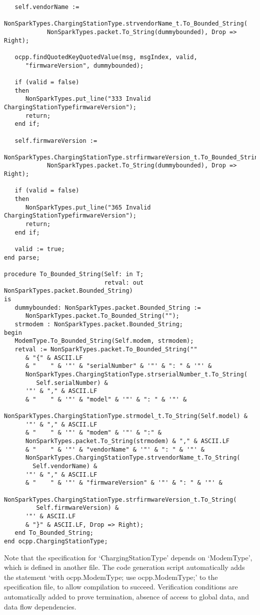 \documentclass[12pt,openany,a4paper]{book}
\begin{document}
\begin{verbatim}
   self.vendorName := 
         NonSparkTypes.ChargingStationType.strvendorName_t.To_Bounded_String(
            NonSparkTypes.packet.To_String(dummybounded), Drop => Right);

   ocpp.findQuotedKeyQuotedValue(msg, msgIndex, valid, 
      "firmwareVersion", dummybounded);

   if (valid = false) 
   then 
      NonSparkTypes.put_line("333 Invalid ChargingStationTypefirmwareVersion"); 
      return; 
   end if;

   self.firmwareVersion := 
      NonSparkTypes.ChargingStationType.strfirmwareVersion_t.To_Bounded_String(
            NonSparkTypes.packet.To_String(dummybounded), Drop => Right);

   if (valid = false) 
   then 
      NonSparkTypes.put_line("365 Invalid ChargingStationTypefirmwareVersion"); 
      return; 
   end if;

   valid := true;
end parse;

procedure To_Bounded_String(Self: in T;
                            retval: out NonSparkTypes.packet.Bounded_String)
is
   dummybounded: NonSparkTypes.packet.Bounded_String := 
      NonSparkTypes.packet.To_Bounded_String(""); 
   strmodem : NonSparkTypes.packet.Bounded_String;
begin
   ModemType.To_Bounded_String(Self.modem, strmodem);
   retval := NonSparkTypes.packet.To_Bounded_String(""
      & "{" & ASCII.LF
      & "    " & '"' & "serialNumber" & '"' & ": " & '"' &
      NonSparkTypes.ChargingStationType.strserialNumber_t.To_String(
         Self.serialNumber) & 
      '"' & "," & ASCII.LF                                                      
      & "    " & '"' & "model" & '"' & ": " & '"' &
      NonSparkTypes.ChargingStationType.strmodel_t.To_String(Self.model) & 
      '"' & "," & ASCII.LF
      & "    " & '"' & "modem" & '"' & ":" & 
      NonSparkTypes.packet.To_String(strmodem) & "," & ASCII.LF 
      & "    " & '"' & "vendorName" & '"' & ": " & '"' &
      NonSparkTypes.ChargingStationType.strvendorName_t.To_String(
      	Self.vendorName) & 
      '"' & "," & ASCII.LF
      & "    " & '"' & "firmwareVersion" & '"' & ": " & '"' &
      NonSparkTypes.ChargingStationType.strfirmwareVersion_t.To_String(
         Self.firmwareVersion) & 
      '"' & ASCII.LF
      & "}" & ASCII.LF, Drop => Right);
   end To_Bounded_String;
end ocpp.ChargingStationType;
\end{verbatim}
Note that the specification for `ChargingStationType' depends on `ModemType', which is defined in another file. The code generation script automatically adds the statement `with ocpp.ModemType; use ocpp.ModemType;' to the specification file, to allow compilation to succeed. Verification conditions are automatically added to prove termination, absence of access to global data, and data flow dependencies.
\end{document}
